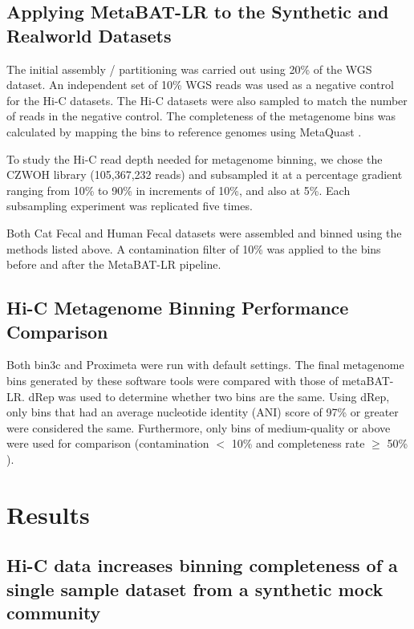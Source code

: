 \documentclass[fleqn,10pt,lineno]{wlpeerj}
\begin{document}
\subsection*{Applying MetaBAT-LR to the Synthetic and Realworld Datasets}

The initial assembly / partitioning was carried out using 20\% of the WGS dataset. An independent set of 10\%  WGS reads was used as a negative control for the Hi-C datasets. The Hi-C datasets were also sampled to match the number of reads in the negative control. The completeness of the metagenome bins was calculated by mapping the bins to reference genomes using MetaQuast \citep{mikheenko2016metaquast}.

To study the Hi-C read depth needed for metagenome binning, we chose the CZWOH library (105,367,232 reads) and subsampled it at a percentage gradient ranging from 10\% to 90\% in increments of 10\%, and also at 5\%. Each subsampling experiment was replicated five times.      

Both Cat Fecal and Human Fecal datasets were assembled and binned using the methods listed above. A contamination filter of 10\% was applied to the bins before and after the MetaBAT-LR pipeline. 

\subsection*{Hi-C Metagenome Binning Performance Comparison}

Both bin3c \citep{demaere2019bin3c} and Proximeta \citep{press2017hi} were run with default settings. The final metagenome bins generated by these software tools were compared with those of metaBAT-LR. dRep \citep{olm2017drep} was used to determine whether two bins are the same. Using dRep, only bins that had an average nucleotide identity (ANI) score of 97\% or greater were considered the same. Furthermore, only bins of medium-quality or above were used for comparison (contamination $<$ 10\% and completeness rate $\ge$ 50\% \citep{bowers2017minimum}).    

\section*{Results}

\subsection*{Hi-C data increases binning completeness of a single sample dataset from a synthetic mock community}
\end{document}
